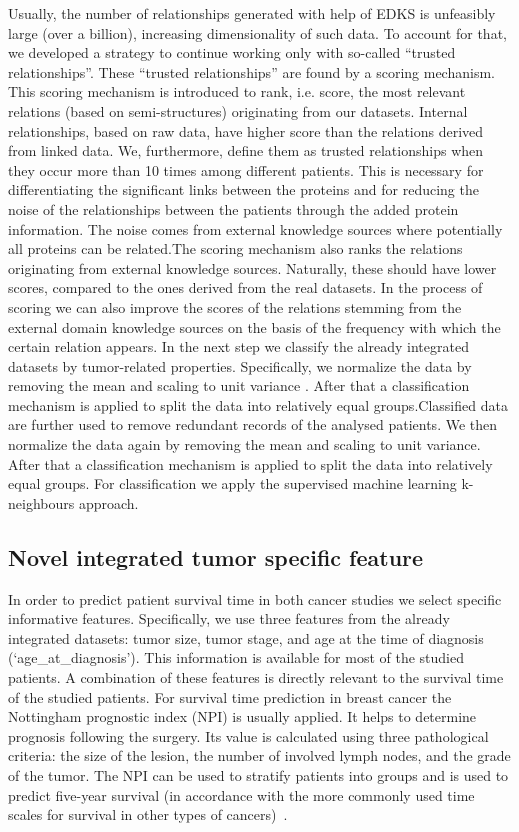 \documentclass{bmcart}
\begin{document}
Usually, the number of relationships generated with help of EDKS is
unfeasibly large (over a billion), increasing dimensionality of such
data. To account for that,  we developed a strategy to continue working
only with so-called {\textquotedblleft}trusted
relationships{\textquotedblright}. These {\textquotedblleft}trusted
relationships{\textquotedblright} are found by a scoring mechanism.
This scoring mechanism is introduced to rank, i.e. score, the most
relevant relations (based on semi-structures) originating from our
datasets. Internal relationships, based on raw data, have higher score than the relations derived from linked data. We, furthermore, define them as trusted relationships when they occur more than 10 times among different patients. This is necessary for differentiating the significant links between the proteins and for reducing the noise of the relationships between the patients through the added protein information. The noise comes from external knowledge sources where potentially all proteins can be related.The scoring mechanism also ranks the relations originating from external knowledge sources. Naturally, these should have lower scores, compared to the ones derived from the real datasets. In the process of scoring we can also improve the scores of the relations stemming from the external domain knowledge sources on the basis of the frequency with which  the certain relation appears. In the next step we classify the already integrated datasets by tumor-related properties. Specifically, we normalize the data by removing the mean and scaling to unit variance \cite{14}. After that a classification mechanism is applied to split the data into relatively equal groups.Classified data are further used to remove redundant records of the analysed patients. We then normalize the data again by removing the mean and scaling to unit variance. After that a classification mechanism is applied to split the data into relatively equal groups. For classification
we apply the supervised machine learning k-neighbours approach.  

\subsection{Novel integrated tumor specific feature}

In order to predict patient survival time in both cancer studies we
select specific informative features. Specifically, we use three
features from the already integrated datasets: tumor size, tumor stage,
and age at the time of diagnosis
({\textquoteleft}age\_at\_diagnosis{\textquoteright}). This information
is available for most of the studied patients. A combination of these
features is directly relevant to the survival time of the studied
patients. For survival time prediction in breast cancer the Nottingham
prognostic index (NPI) is usually applied. It helps to determine
prognosis following the surgery. Its value is calculated using three
pathological criteria: the size of the lesion, the number of involved
lymph nodes, and the grade of the tumor. The NPI can be used to
stratify patients into groups and is used to predict five-year survival
(in accordance with the more commonly used time scales for survival in
other types of cancers)~\cite{15}.
\end{document}
